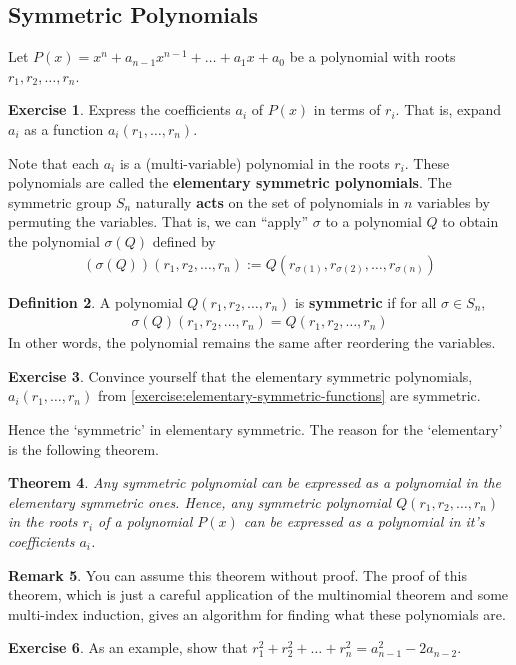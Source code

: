 \documentclass[reqno, 12pt, letter]{article}
\theoremstyle{plain}
\newtheorem{theorem}{Theorem}[section]
\theoremstyle{definition}
\newtheorem{definition}[theorem]{Definition}
\newtheorem{remark}[theorem]{Remark}
\newtheorem{exercise}[theorem]{Exercise}
\theoremstyle{remark}
\numberwithin{equation}{section}
\begin{document}
	\subsection{Symmetric Polynomials}	
	
	Let $ P(x) = x^n + a_{n-1} x^{n-1} + \dots + a_1 x + a_0$ be a polynomial with roots $ r_1, r_2, \dots, r_n$.
	
	\begin{exercise}
		\label{exercise:elementary-symmetric-functions}
		Express the coefficients $a_i$ of $ P(x)$ in terms of $ r_i$. That is, expand $a_i$ as a function $a_i(r_1, \ldots, r_n)$.
	\end{exercise}
	Note that each $ a_i$ is a (multi-variable) polynomial in the roots $ r_i$. These polynomials are called the \textbf{elementary symmetric polynomials}.
	The symmetric group $ S_n$ naturally \textbf{acts} on the set of polynomials in $ n$ variables by permuting the variables. 
	That is, we can ``apply'' $\sigma$ to a polynomial $Q$ to obtain the polynomial $\sigma(Q)$ defined by
		\begin{align*}
			(\sigma(Q))(r_1, r_2, \dots, r_n) := Q(r_{\sigma(1)}, r_{\sigma(2)}, \dots, r_{\sigma(n)})
		\end{align*}
		\begin{definition}
			\label{definition:}
			A polynomial $Q(r_1, r_2, \dots, r_n)$ is {\bf symmetric} if for all $\sigma \in S_n $, 
	\begin{align*}
		\sigma(Q) (r_1, r_2, \dots, r_n)= Q(r_1, r_2, \dots, r_n)
	\end{align*}
	In other words, the polynomial remains the same after reordering the variables.
		\end{definition}
		
	\begin{exercise}
		Convince yourself that the elementary symmetric polynomials, $a_i(r_1, \ldots, r_n)$ from \autoref{exercise:elementary-symmetric-functions}
		are symmetric.
	\end{exercise}
	
	Hence the `symmetric' in elementary symmetric. The reason for the `elementary' is the following theorem. 
	
	\begin{theorem}
		\label{theorem:fundamental_theorem_symmetric_polynomials}
		Any symmetric polynomial can be expressed as a polynomial in the elementary symmetric ones. 
		Hence, any symmetric polynomial $ Q(r_1, r_2, \dots, r_n)$ in the roots $ r_i$ of a polynomial $ P(x)$ can be expressed as a polynomial in it's coefficients $ a_i$.
	\end{theorem}
	\begin{remark}
		You can assume this theorem without proof. The proof of this theorem, which is just a careful application of the multinomial theorem and some multi-index induction, gives an algorithm for finding what these polynomials are.
	\end{remark}
	\begin{exercise}
		As an example, show that $ r_1^2 + r_2^2 + \dots + r_n^2  = a_{n-1}^2 - 2 a_{n-2}$.
	\end{exercise}
	
\end{document}
